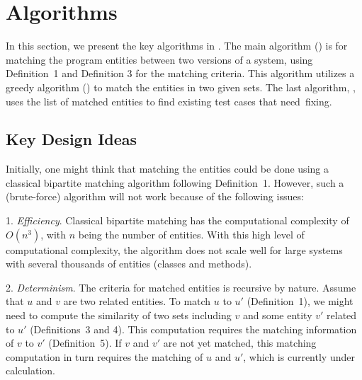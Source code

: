 \section{{\tool} Algorithms}
\label{algosection}

In this section, we present the key algorithms in {\tool}.
The main algorithm () is for matching the program
entities between two versions of a system, using Definition~1 and
Definition 3 for the matching criteria. This algorithm utilizes a
greedy algorithm () to match the entities in two
given sets. The last algorithm, , uses the list of
matched entities to find existing test cases that need~fixing.




\subsection{Key Design Ideas}

Initially, one might think that matching the entities could be done
using a classical bipartite matching algorithm following
Definition~1. However, such a (brute-force) algorithm will not work
because of the following issues:

1. {\em Efficiency}. Classical bipartite matching has the
   computational complexity of $O(n^3)$, with $n$ being the number of
   entities. With this high level of computational complexity, the
   algorithm does not scale well for large systems with several
   thousands of entities (classes and methods).

2. {\em Determinism}. The criteria for matched entities is recursive
   by nature. Assume that $u$ and $v$ are two related entities. To
   match $u$ to $u'$ (Definition~1), we might need to compute the
   similarity of two sets including $v$ and some entity $v'$ related
   to $u'$ (Definitions~3 and 4). This computation requires the
   matching information of $v$ to $v'$ (Definition~5). If $v$ and $v'$
   are not yet matched, this matching computation in turn requires the
   matching of $u$ and $u'$, which is currently under calculation.


